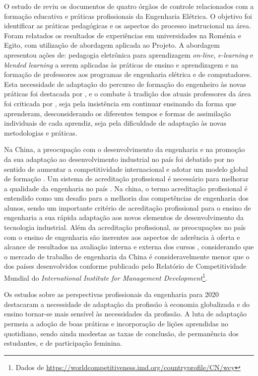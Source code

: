 \documentclass{textolivre}
\begin{document}
O estudo de \textcite{eldin2018} reviu os documentos de quatro órgãos de controle relacionados com a formação educativa e práticas profissionais da Engenharia Elétrica. O objetivo foi identificar as práticas pedagógicas e os aspectos do processo instrucional na área. Foram relatados os resultados de experiências em universidades na Roménia e Egito, com utilização de abordagem aplicada ao Projeto. A abordagem apresentou ações de: pedagogia eletrônica para aprendizagem \textit{on-line}, \textit{e-learning} e \textit{blended learning} a serem aplicadas às práticas de ensino e aprendizagem e na formação de professores aos programas de engenharia elétrica e de computadores. Esta necessidade de adaptação do percurso de formação do engenheiro às novas práticas foi destacada por \textcite{maciejewski2017}, e o combate à tradição dos atuais professores da área foi criticada por \textcite{sheppard2008}, seja pela insistência em continuar ensinando da forma que aprenderam, desconsiderando os diferentes tempos e formas de assimilação individuais de cada aprendiz, seja pela dificuldade de adaptação às novas metodologias e práticas.

Na China, a preocupação com o desenvolvimento da engenharia e na promoção da sua adaptação ao desenvolvimento industrial no país foi debatido por \textcite{patil2007} no sentido de aumentar a competitividade internacional e adotar um modelo global de formação \cite{shuguang2019}. Um sistema de acreditação profissional é necessário para melhorar a qualidade da engenharia no país \cite{lu2019}. Na china, o termo acreditação profissional é entendido como um desafio para a melhoria das competências de engenharia dos alunos, sendo um importante critério de acreditação profissional para o ensino de engenharia a sua rápida adaptação aos novos elementos de desenvolvimento da tecnologia industrial. Além da acreditação profissional, as preocupações no país com o ensino de engenharia são inerentes aos aspectos de aderência à oferta e alcance de resultados na avaliação interna e externa dos cursos \cite{li2020}, considerando que o mercado de trabalho de engenharia da China é consideravelmente menor que o dos países desenvolvidos conforme publicado pelo Relatório de Competitividade Mundial do \textit{International Institute for Management Development}\footnote{Dados de \url{https://worldcompetitiveness.imd.org/countryprofile/CN/wcy}}.

Os estudos sobre as perspectivas profissionais da engenharia para 2020 \cite{clough2004,engineering2005,olson2016,sheppard2008} destacaram a necessidade de adaptação da profissão à economia globalizada e do ensino tornar-se mais sensível às necessidades da profissão. A luta de adaptação permeia a adoção de boas práticas e incorporação de lições aprendidas no quotidiano, sendo ainda modestas as taxas de conclusão, de permanência dos estudantes, e de participação feminina.
\end{document}
